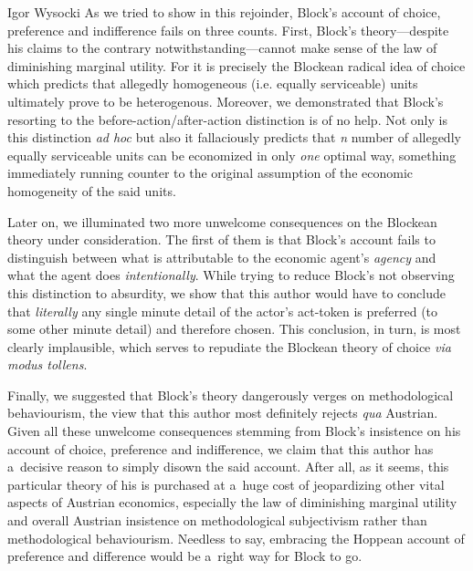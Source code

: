 \begin{artengenv}{Igor Wysocki}
As we tried to show in this rejoinder, Block's account of choice, preference and indifference fails on three counts. First, Block's theory---despite his claims to the contrary notwithstanding---cannot make sense of the law of diminishing marginal utility. For it is precisely the Blockean radical idea of choice which predicts that allegedly homogeneous (i.e. equally serviceable) units ultimately prove to be heterogenous. Moreover, we demonstrated that Block's resorting to the before-action/after-action distinction is of no help. Not only is this distinction \textit{ad hoc} but also it fallaciously predicts that \textit{n} number of allegedly equally serviceable units can be economized in only \textit{one} optimal way, something immediately running counter to the original assumption of the economic homogeneity of the said units.



Later on, we illuminated two more unwelcome consequences on the Blockean theory under consideration. The first of them is that Block's 
\parencite*[][]{block_response_2022} %
 account fails to distinguish between what is attributable to the economic agent's \textit{agency} and what the agent does \textit{intentionally}. While trying to reduce Block's not observing this distinction to absurdity, we show that this author would have to conclude that \textit{literally} any single minute detail of the actor's act-token is preferred (to some other minute detail) and therefore chosen. This conclusion, in turn, is most clearly implausible, which serves to repudiate the Blockean theory of choice \textit{via modus tollens}.



Finally, we suggested that Block's theory dangerously verges on methodological behaviourism, the view that this author most definitely rejects \textit{qua} Austrian. Given all these unwelcome consequences stemming from Block's insistence on his account of choice, preference and indifference, we claim that this author has a~decisive reason to simply disown the said account. After all, as it seems, this particular theory of his is purchased at a~huge cost of jeopardizing other vital aspects of Austrian economics, especially the law of diminishing marginal utility and overall Austrian insistence on methodological subjectivism rather than methodological behaviourism. Needless to say, embracing the Hoppean 
\parencite*[][]{hoppe_must_2005} %
 account of preference and difference would be a~right way for Block to go.





\end{artengenv}\label{wysocki-rejoinder-lastpage}


